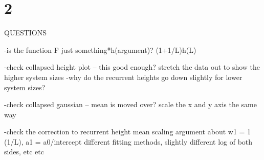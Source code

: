\documentclass[12pt]{report}
\begin{document}

\section*{2}


QUESTIONS

-is the function F just something*h(argument)?
	(1+1/L)h(L)

-check collapsed height plot -- this good enough? 
	stretch the data out to show the higher system sizes 
	-why do the recurrent heights go down slightly for lower system sizes? 

-check collapsed gaussian -- mean is moved over?
	scale the x and y axis the same way 

-check the correction to recurrent height mean scaling 
	argument about w1 = 1 (1/L), a1 = a0/intercept 
	different fitting methods, slightly different 
		log of both sides, etc etc 


















\end{document}
